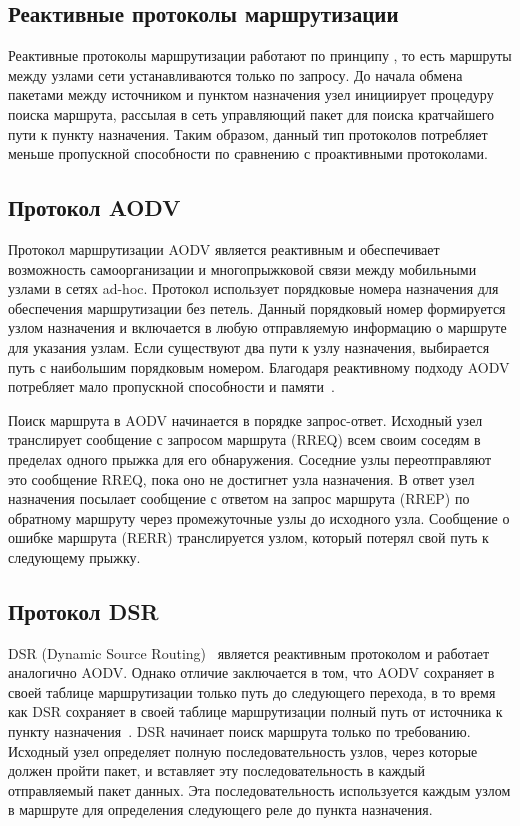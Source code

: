 \subsection{Реактивные протоколы маршрутизации}

Реактивные протоколы маршрутизации работают по принципу , то есть маршруты между узлами сети устанавливаются только по запросу. До начала обмена пакетами между источником и пунктом назначения узел инициирует процедуру поиска маршрута, рассылая в сеть управляющий пакет для поиска кратчайшего пути к пункту назначения. Таким образом, данный тип протоколов потребляет меньше пропускной способности по сравнению с проактивными протоколами.

\subsection{Протокол AODV}

Протокол маршрутизации AODV является реактивным и обеспечивает возможность самоорганизации и многопрыжковой связи между мобильными узлами в сетях ad-hoc. Протокол использует порядковые номера назначения для обеспечения маршрутизации без петель. Данный порядковый номер формируется узлом назначения и включается в любую отправляемую информацию о маршруте для указания узлам. Если существуют два пути к узлу назначения, выбирается путь с наибольшим порядковым номером. Благодаря реактивному подходу AODV потребляет мало пропускной способности и памяти~\cite{pande2021performance}.

Поиск маршрута в AODV начинается в порядке запрос-ответ. Исходный узел транслирует сообщение с запросом маршрута (RREQ) всем своим соседям в пределах одного прыжка для его обнаружения. Соседние узлы переотправляют это сообщение RREQ, пока оно не достигнет узла назначения. В ответ узел назначения посылает сообщение с ответом на запрос маршрута (RREP) по обратному маршруту через промежуточные узлы до исходного узла. Сообщение о ошибке маршрута (RERR) транслируется узлом, который потерял свой путь к следующему прыжку.

\subsection{Протокол DSR}

DSR (Dynamic Source Routing)~\cite{johnson2001dsr} является реактивным протоколом и работает аналогично AODV. Однако отличие заключается в том, что AODV сохраняет в своей таблице маршрутизации только путь до следующего перехода, в то время как DSR сохраняет в своей таблице маршрутизации полный путь от источника к пункту назначения~\cite{bai2006doa}. DSR начинает поиск маршрута только по требованию. Исходный узел определяет полную последовательность узлов, через которые должен пройти пакет, и вставляет эту последовательность в каждый отправляемый пакет данных. Эта последовательность используется каждым узлом в маршруте для определения следующего реле до пункта назначения.